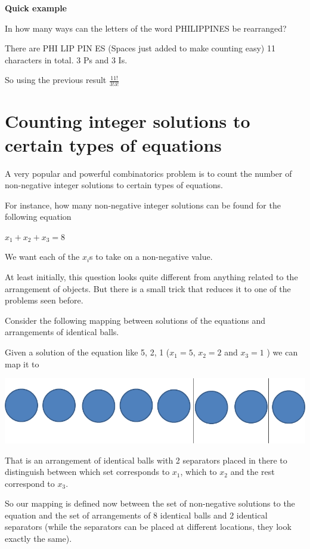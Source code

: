 \documentclass[12pt]{article}
\begin{document}
\textbf{Quick example}

In how many ways can the letters of the word PHILIPPINES be rearranged?

There are PHI LIP PIN ES (Spaces just added to make counting easy) 11 characters in total. 3 Ps and 3 Is. 

So using the previous result $\frac{11!}{3!3!}$

\section*{Counting integer solutions to certain types of equations}

A very popular and powerful combinatorics problem is to count the number of non-negative integer solutions to certain types of equations.

For instance, how many non-negative integer solutions can be found for the following equation

$x_1 + x_2 + x_3 = 8$

We want each of the $x_i$s to take on a non-negative value. 

At least initially, this question looks quite different from anything related to the arrangement of objects. But there is a small trick that reduces it to one of the problems seen before.

Consider the following mapping between solutions of the equations and arrangements of identical balls.

Given a solution of the equation like 5, 2, 1 ($x_1 = 5$, $x_2 = 2$ and $x_3 = 1$ ) we can map it to

\includegraphics[scale=0.5]{Separators.png}

That is an arrangement of identical balls with 2 separators placed in there to distinguish between which set corresponds to $x_1$, which to $x_2$ and the rest correspond to $x_3$.

So our mapping is defined now between the set of non-negative solutions to the equation and the set of arrangements of 8 identical balls and 2 identical separators (while the separators can be placed at different locations, they look exactly the same).
\end{document}
